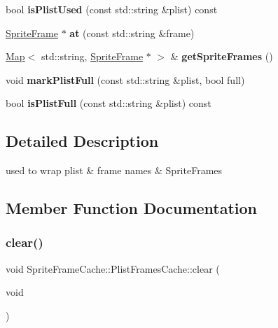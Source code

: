\begin{DoxyCompactItemize}
bool {\bfseries is\+Plist\+Used} (const std\+::string \&plist) const
\item 
\mbox{\label{classSpriteFrameCache_1_1PlistFramesCache_a6a09a47f27af9a9b80859fc0a3eb73ec}} 
\hyperlink{classSpriteFrame}{Sprite\+Frame} $\ast$ {\bfseries at} (const std\+::string \&frame)
\item 
\mbox{\label{classSpriteFrameCache_1_1PlistFramesCache_a72f805ab20cf555025ed41e0854277ff}} 
\hyperlink{classMap}{Map}$<$ std\+::string, \hyperlink{classSpriteFrame}{Sprite\+Frame} $\ast$ $>$ \& {\bfseries get\+Sprite\+Frames} ()
\item 
\mbox{\label{classSpriteFrameCache_1_1PlistFramesCache_a0ae3da4ba5d7fb7c4fef92de3d13ef8f}} 
void {\bfseries mark\+Plist\+Full} (const std\+::string \&plist, bool full)
\item 
\mbox{\label{classSpriteFrameCache_1_1PlistFramesCache_a4b87604ca9a23b989d582ca45da93bdc}} 
bool {\bfseries is\+Plist\+Full} (const std\+::string \&plist) const
\end{DoxyCompactItemize}


\subsection{Detailed Description}
used to wrap plist \& frame names \& Sprite\+Frames 

\subsection{Member Function Documentation}
\mbox{\label{classSpriteFrameCache_1_1PlistFramesCache_a57282d76fa3158b1807905d9a7d4d622}} 
\subsubsection{\texorpdfstring{clear()}{clear()}}
{\footnotesize\ttfamily void Sprite\+Frame\+Cache\+::\+Plist\+Frames\+Cache\+::clear (\begin{DoxyParamCaption}\item[{void}]{ }\end{DoxyParamCaption})}

